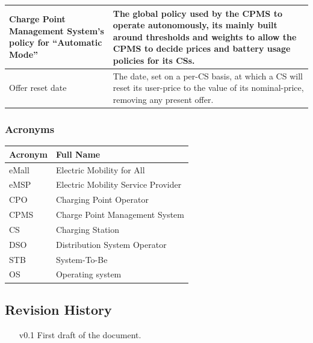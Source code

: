 \documentclass[11pt]{article}
\begin{document}
\begin{table}[H]
\begin{tabularx}{\textwidth}{|>{\centering\hsize=0.4\hsize}X|>{\hsize=1.6\hsize}X|}
        \hline
        Charge Point Management System's policy for “Automatic Mode” & The global policy used by the CPMS to operate autonomously, its mainly built around thresholds and weights to allow the CPMS to decide prices and battery usage policies for its CSs. \\
        \hline
        Offer reset date & The date, set on a per-CS basis, at which a CS will reset its user-price to the value of its nominal-price, removing any present offer. \\
        \hline
    \end{tabularx}
    \label{tab:definitions}
\end{table}

\subsubsection{Acronyms}

\begin{table}[H]
    \centering
    \setlength{\tabcolsep}{18pt}
    \renewcommand{\arraystretch}{1.2}
    \begin{tabularx}{\textwidth}{|>{\centering\hsize=0.3\hsize}X|>{\hsize=1.7\hsize}X|}
        \hline
        \textbf{Acronym} & \textbf{Full Name} \\
        \hline
        eMall & Electric Mobility for All \\
        \hline
        eMSP & Electric Mobility Service Provider \\
        \hline
        CPO & Charging Point Operator \\
        \hline
        CPMS & Charge Point Management System \\
        \hline
        CS & Charging Station \\
        \hline
        DSO & Distribution System Operator \\
        \hline
        STB & System-To-Be \\
        \hline
        OS & Operating system \\
        \hline
    \end{tabularx}
    \label{tab:acronyms}
\end{table}

\subsection{Revision History}

\begin{enumerate}
    \item[v0.1] First draft of the document.
\end{enumerate}
\end{document}
